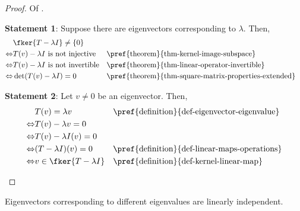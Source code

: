 \begin{proof}
	Of .
	\begin{flushleft}
		\textbf{Statement 1}: Suppose there are eigenvectors corresponding to $\lambda$. Then,
		\begin{align*}
			 & \fker{T - \lambda I}\neq\{0\}                                                                               \\
			\Leftrightarrow
			 & T(v) - \lambda I\text{ is not injective}  &  & \text{\pref{theorem}{thm-kernel-image-subspace}}             \\
			\Leftrightarrow
			 & T(v) - \lambda I\text{ is not invertible} &  & \text{\pref{theorem}{thm-linear-operator-invertible}}        \\
			\Leftrightarrow
			 & \det(T(v) - \lambda I) = 0                &  & \text{\pref{theorem}{thm-square-matrix-properties-extended}}
		\end{align*}
	\end{flushleft}
	\begin{flushleft}
		\textbf{Statement 2}: Let $v\neq0$ be an eigenvector. Then,
		\begin{align*}
			 & T(v) = \lambda v         &  & \text{\pref{definition}{def-eigenvector-eigenvalue}} \\
			\Leftrightarrow
			 & T(v) - \lambda v = 0                                                               \\
			\Leftrightarrow
			 & T(v) - \lambda I(v) = 0                                                            \\
			\Leftrightarrow
			 & (T - \lambda I)(v) = 0   &  & \text{\pref{definition}{def-linear-maps-operations}} \\
			\Leftrightarrow
			 & v\in\fker{T - \lambda I} &  & \text{\pref{definition}{def-kernel-linear-map}}
		\end{align*}
	\end{flushleft}
\end{proof}

\begin{thm}\label{thm-eigenvalue-eigenvector-linearly-independent}
	Eigenvectors corresponding to different eigenvalues are linearly independent.
\end{thm}

